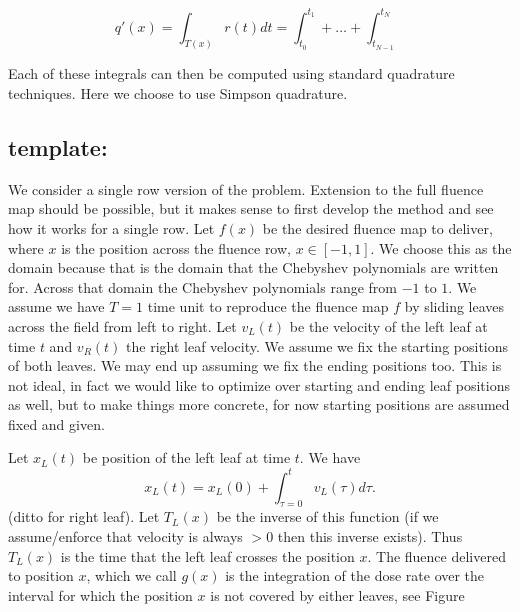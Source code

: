 \begin{equation}
q'(x) = \int_{T(x)} r(t) dt = \int_{t_0}^ {t_1} + \dots + \int_{t_{N-1}}^ {t_N}
\label{eqn:deliveredFluenceDoseSum}
\end{equation}

Each of these integrals can then be computed using standard quadrature techniques.
Here we choose to use Simpson quadrature.

\subsection{template:}

We consider a single row version of the problem. 
Extension to the full fluence map should be possible, but it makes sense to first develop the method and see how it works for a single row. 
Let $f(x)$ be the desired fluence map to deliver, where $x$ is the position across the fluence row, $x \in [-1,1]$. 
We choose this as the domain because that is the domain that the Chebyshev polynomials are written for. 
Across that domain the Chebyshev polynomials range from $-1$ to $1$.
We assume we have $T=1$ time unit to reproduce the fluence map $f$ by sliding leaves across the field from left to right.
Let $v_L(t)$ be the velocity of the left leaf at time $t$ and $v_R(t)$ the right leaf velocity. 
We assume we fix the starting positions of both leaves. 
We may end up assuming we fix the ending positions too. 
This is not ideal, in fact we would like to optimize over starting and ending leaf positions as well, but to make things more concrete, for now starting positions are assumed fixed and given.

Let $x_L(t)$ be position of the left leaf at time $t$. We have
\begin{equation}
  x_L(t) = x_L(0) + \int_{\tau=0}^t v_L(\tau) d\tau.
\end{equation}
\noindent (ditto for right leaf). Let $T_L(x)$ be the inverse of this function
(if we assume/enforce that velocity is always $>0$ then this inverse exists). Thus
$T_L(x)$ is the time that the left leaf crosses the position $x$. The fluence delivered to position
$x$, which we call $g(x)$ is the integration of the dose rate over the interval for which the position $x$ is not covered by either leaves, see Figure
 

